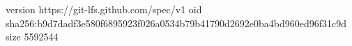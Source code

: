 version https://git-lfs.github.com/spec/v1
oid sha256:b9d7dadf3e580f6895923f026a0534b79b41790d2692e0ba4bd960ed96f31c9d
size 5592544
